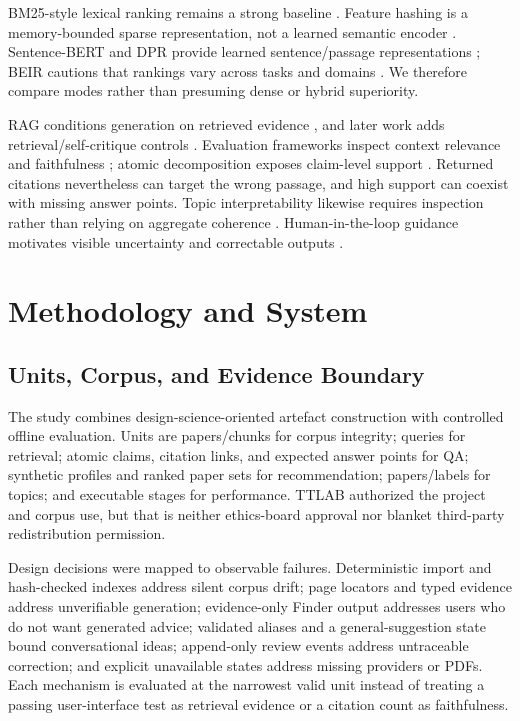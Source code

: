 \documentclass[conference,letterpaper]{IEEEtran}
\begin{document}
BM25-style lexical ranking remains a strong baseline \cite{robertson2009bm25}. Feature hashing is a memory-bounded sparse representation, not a learned semantic encoder \cite{weinberger2009featurehashing}. Sentence-BERT and DPR provide learned sentence/passage representations \cite{reimers2019sentencebert,karpukhin2020dpr}; BEIR cautions that rankings vary across tasks and domains \cite{thakur2021beir}. We therefore compare modes rather than presuming dense or hybrid superiority.

RAG conditions generation on retrieved evidence \cite{lewis2020rag}, and later work adds retrieval/self-critique controls \cite{asai2024selfrag}. Evaluation frameworks inspect context relevance and faithfulness \cite{es2024ragas,saadfalcon2024ares}; atomic decomposition exposes claim-level support \cite{min2023factscore}. Returned citations nevertheless can target the wrong passage, and high support can coexist with missing answer points. Topic interpretability likewise requires inspection rather than relying on aggregate coherence \cite{doogan2021topic}. Human-in-the-loop guidance motivates visible uncertainty and correctable outputs \cite{amershi2014power}.

\section{Methodology and System}
\subsection{Units, Corpus, and Evidence Boundary}
The study combines design-science-oriented artefact construction with controlled offline evaluation. Units are papers/chunks for corpus integrity; queries for retrieval; atomic claims, citation links, and expected answer points for QA; synthetic profiles and ranked paper sets for recommendation; papers/labels for topics; and executable stages for performance. TTLAB authorized the project and corpus use, but that is neither ethics-board approval nor blanket third-party redistribution permission.

Design decisions were mapped to observable failures. Deterministic import and hash-checked indexes address silent corpus drift; page locators and typed evidence address unverifiable generation; evidence-only Finder output addresses users who do not want generated advice; validated aliases and a general-suggestion state bound conversational ideas; append-only review events address untraceable correction; and explicit unavailable states address missing providers or PDFs. Each mechanism is evaluated at the narrowest valid unit instead of treating a passing user-interface test as retrieval evidence or a citation count as faithfulness.
\end{document}
